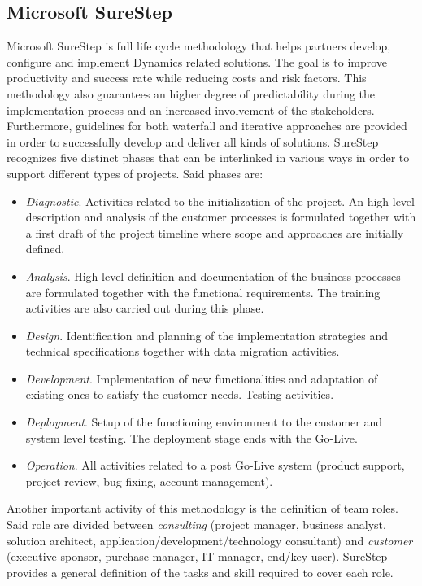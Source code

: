 \subsection{Microsoft SureStep}

Microsoft SureStep \cite{SureStepBook} is full life cycle methodology that helps partners develop, configure and implement Dynamics related solutions. The goal is to improve productivity and success rate while reducing costs and risk factors. This methodology also guarantees an higher degree of predictability during the implementation process and an increased involvement of the stakeholders. Furthermore, guidelines for both waterfall and iterative approaches  are provided in order to successfully develop and deliver all kinds of solutions. SureStep recognizes five distinct phases that can be interlinked in various ways in order to support different types of projects. Said phases are: 

\begin{itemize}
    \item \textit{Diagnostic}. Activities related to the initialization of the project. An high level description and analysis of the customer processes is formulated together with a first draft of the project timeline where scope and approaches are initially defined. 
    \item \textit{Analysis}. High level definition and documentation of the business processes are formulated together with the functional requirements. The training activities are also carried out during this phase.
    \item \textit{Design}. Identification and planning of the implementation strategies and technical specifications together with data migration activities.
    \item \textit{Development}. Implementation of new functionalities and adaptation of existing ones to satisfy the customer needs. Testing activities.
    \item \textit{Deployment}. Setup of the functioning environment to the customer and system level testing. The deployment stage ends with the Go-Live.
    \item \textit{Operation}. All activities related to a post Go-Live system (product support, project review, bug fixing, account management).
\end{itemize}

Another important activity of this methodology is the definition of team roles. Said role are divided between \textit{consulting} (project manager, business analyst, solution architect, application/development/technology consultant) and \textit{customer} (executive sponsor, purchase manager, IT manager, end/key user). SureStep provides a general definition of the tasks and skill required to cover each role.

